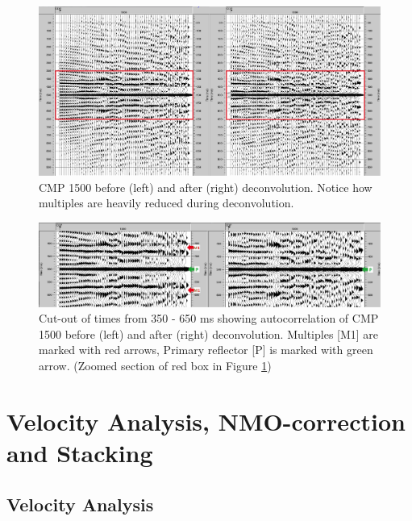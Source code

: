 \documentclass[10pt,a4paper]{article}
\begin{document}
\begin{figure}[H]
\includegraphics[width=\textwidth]{fig19.jpg}
\caption{CMP 1500 before (left) and after (right) deconvolution. Notice how multiples are heavily reduced during deconvolution.}
\label{fig19}
\end{figure}

\begin{figure}[H]
\includegraphics[width=\textwidth]{fig20.jpg}
\caption{Cut-out of times from 350 - 650 ms showing autocorrelation of CMP 1500 before (left) and after (right) deconvolution. Multiples [M1] are marked with red arrows, Primary reflector [P] is marked with green arrow. (Zoomed section of red box in Figure \ref{fig19})}
\label{fig20}
\end{figure}


\section{Velocity Analysis, NMO-correction and Stacking}

\subsection{Velocity Analysis}
\end{document}
